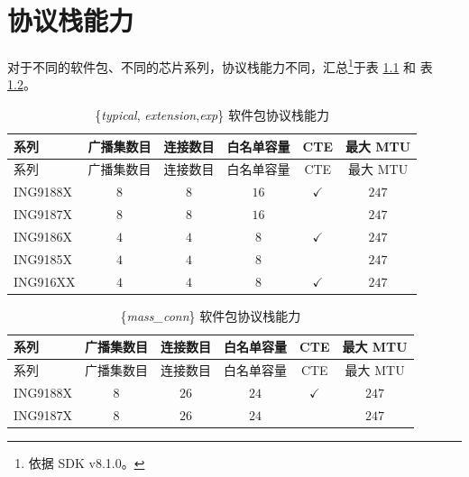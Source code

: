 \documentclass[
  12pt,
]{book}
\begin{document}
\hypertarget{ch-cap}{%
\chapter{协议栈能力}\label{ch-cap}}

对于不同的软件包、不同的芯片系列，协议栈能力不同，汇总\footnote{依据 SDK v8.1.0。}于表 \ref{tab:ch99-typical-stack-cap} 和 表 \ref{tab:ch99-mass-conn-stack-cap}。

\begin{longtable}[]{@{}lccccc@{}}
\caption{\label{tab:ch99-typical-stack-cap} \{\emph{typical}, \emph{extension},\emph{exp}\} 软件包协议栈能力}\tabularnewline
\toprule
系列 & 广播集数目 & 连接数目 & 白名单容量 & CTE & 最大 MTU\tabularnewline
\midrule
\endfirsthead
\toprule
系列 & 广播集数目 & 连接数目 & 白名单容量 & CTE & 最大 MTU\tabularnewline
\midrule
\endhead
ING9188X & \(8\) & \(8\) & \(16\) & \(\checkmark\) & \(247\)\tabularnewline
ING9187X & \(8\) & \(8\) & \(16\) & & \(247\)\tabularnewline
ING9186X & \(4\) & \(4\) & \(8\) & \(\checkmark\) & \(247\)\tabularnewline
ING9185X & \(4\) & \(4\) & \(8\) & & \(247\)\tabularnewline
ING916XX & \(4\) & \(4\) & \(8\) & \(\checkmark\) & \(247\)\tabularnewline
\bottomrule
\end{longtable}

\begin{longtable}[]{@{}lccccc@{}}
\caption{\label{tab:ch99-mass-conn-stack-cap} \{\emph{mass\_conn}\} 软件包协议栈能力}\tabularnewline
\toprule
系列 & 广播集数目 & 连接数目 & 白名单容量 & CTE & 最大 MTU\tabularnewline
\midrule
\endfirsthead
\toprule
系列 & 广播集数目 & 连接数目 & 白名单容量 & CTE & 最大 MTU\tabularnewline
\midrule
\endhead
ING9188X & \(8\) & \(26\) & \(24\) & \(\checkmark\) & \(247\)\tabularnewline
ING9187X & \(8\) & \(26\) & \(24\) & & \(247\)\tabularnewline
\bottomrule
\end{longtable}

  

\backmatter
\printindex
\end{document}
